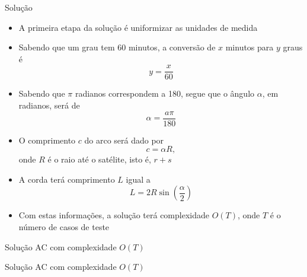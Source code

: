 \begin{frame}[fragile]{Solução}

    \begin{itemize}
        \item A primeira etapa da solução é uniformizar as unidades de medida

        \item Sabendo que um grau tem 60 minutos, a conversão de $x$ minutos para $y$ graus é
        \[
            y = \frac{x}{60}
        \]

        \item Sabendo que $\pi$ radianos correspondem a 180\textdegree, segue que o ângulo $\alpha$,
            em radianos, será de
        \[
            \alpha = \frac{a\pi}{180}
        \]

        \item O comprimento $c$ do arco será dado por
        \[
            c = \alpha R,
        \]
        onde $R$ é o raio até o satélite, isto é, $r + s$

        \item A corda terá comprimento $L$ igual a
        \[
            L = 2R\sin(\frac{\alpha}{2})
        \]

        \item Com estas informações, a solução terá complexidade $O(T)$, onde $T$ é o número de
            casos de teste
    \end{itemize}

\end{frame}

\begin{frame}[fragile]{Solução AC com complexidade $O(T)$}
\end{frame}

\begin{frame}[fragile]{Solução AC com complexidade $O(T)$}
\end{frame}

